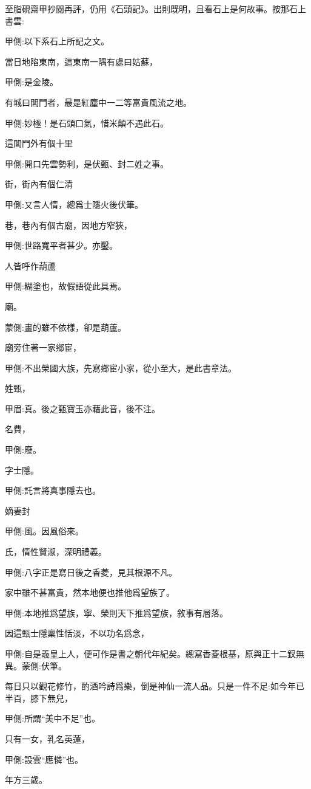 \begin{parag}
    至脂硯齋甲抄閱再評，仍用《石頭記》。出則既明，且看石上是何故事。按那石上書雲:\begin{note}甲側:以下系石上所記之文。\end{note}
\end{parag}


\begin{parag}
    當日地陷東南，這東南一隅有處曰姑蘇，\begin{note}甲側:是金陵。\end{note}有城曰閶門者，最是紅塵中一二等富貴風流之地。\begin{note}甲側:妙極！是石頭口氣，惜米顛不遇此石。\end{note}這閶門外有個十里\begin{note}甲側:開口先雲勢利，是伏甄、封二姓之事。\end{note}街，街內有個仁清\begin{note}甲側:又言人情，總爲士隱火後伏筆。\end{note}巷，巷內有個古廟，因地方窄狹，\begin{note}甲側:世路寬平者甚少。亦鑿。\end{note}人皆呼作葫蘆\begin{note}甲側:糊塗也，故假語從此具焉。\end{note}廟。\begin{note}蒙側:畫的雖不依樣，卻是葫蘆。\end{note}廟旁住著一家鄉宦，\begin{note}甲側:不出榮國大族，先寫鄉宦小家，從小至大，是此書章法。\end{note}姓甄，\begin{note}甲眉:真。後之甄寶玉亦藉此音，後不注。\end{note}名費，\begin{note}甲側:廢。\end{note}字士隱。\begin{note}甲側:託言將真事隱去也。\end{note}嫡妻封\begin{note}甲側:風。因風俗來。\end{note}氏，情性賢淑，深明禮義。\begin{note}甲側:八字正是寫日後之香菱，見其根源不凡。\end{note}家中雖不甚富貴，然本地便也推他爲望族了。\begin{note}甲側:本地推爲望族，寧、榮則天下推爲望族，敘事有層落。\end{note}因這甄士隱稟性恬淡，不以功名爲念，\begin{note}甲側:自是羲皇上人，便可作是書之朝代年紀矣。總寫香菱根基，原與正十二釵無異。蒙側:伏筆。\end{note}每日只以觀花修竹，酌酒吟詩爲樂，倒是神仙一流人品。只是一件不足:如今年已半百，膝下無兒，\begin{note}甲側:所謂“美中不足”也。\end{note}只有一女，乳名英蓮，\begin{note}甲側:設雲“應憐”也。\end{note}年方三歲。
\end{parag}


